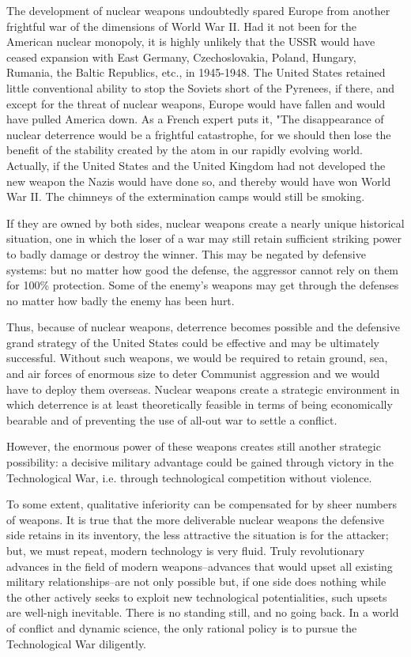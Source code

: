 The development of nuclear weapons undoubtedly spared Europe from another frightful war of the dimensions of World War II. Had it not been for the American nuclear monopoly, it is highly unlikely that the USSR would have ceased expansion with East Germany, Czechoslovakia, Poland, Hungary, Rumania, the Baltic Republics, etc., in 1945-1948. The United States retained little conventional ability to stop the Soviets short of the Pyrenees, if there, and except for the threat of nuclear weapons, Europe would have fallen and would have pulled America down. As a French expert puts it, "The disappearance of nuclear deterrence would be a frightful catastrophe, for we should then lose the benefit of the stability created by the atom in our rapidly evolving world. Actually, if the United States and the United Kingdom had not developed the new weapon the Nazis would have done so, and thereby would have won World War II. The chimneys of the extermination camps would still be smoking.

If they are owned by both sides, nuclear weapons create a nearly unique historical situation, one in which the loser of a war may still retain sufficient striking power to badly damage or destroy the winner. This may be negated by defensive systems: but no matter how good the defense, the aggressor cannot rely on them for 100\% protection. Some of the enemy's weapons may get through the defenses no matter how badly the enemy has been hurt.

Thus, because of nuclear weapons, deterrence becomes possible and the defensive grand strategy of the United States could be effective and may be ultimately successful. Without such weapons, we would be required to retain ground, sea, and air forces of enormous size to deter Communist aggression and we would have to deploy them overseas. Nuclear weapons create a strategic environment in which deterrence is at least theoretically feasible in terms of being economically bearable and of preventing the use of all-out war to settle a conflict.

However, the enormous power of these weapons creates still another strategic possibility: a decisive military advantage could be gained through victory in the Technological War, i.e. through technological competition without violence.

To some extent, qualitative inferiority can be compensated for by sheer numbers of weapons. It is true that the more deliverable nuclear weapons the defensive side retains in its inventory, the less attractive the situation is for the attacker; but, we must repeat, modern technology is very fluid. Truly revolutionary advances in the field of modern weapons--advances that would upset all existing military relationships--are not only possible but, if one side does nothing while the other actively seeks to exploit new technological potentialities, such upsets are well-nigh inevitable. There is no standing still, and no going back. In a world of conflict and dynamic science, the only rational policy is to pursue the Technological War diligently.


